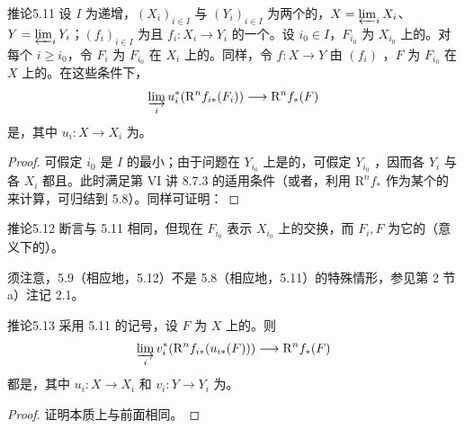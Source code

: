 \begin{SGAresult}{推论}{5.11}
设 $I$ 为递增，$(X_i)_{i\in I}$ 与 $(Y_i)_{i\in I}$ 为两个的，$X=\varprojlim_iX_i$、$Y=\varprojlim_iY_i$；$(f_i)_{i\in I}$ 为且 $f_i:X_i\to Y_i$ 的一个。设 $i_0\in I$，$F_{i_0}$ 为 $X_{i_0}$ 上的。对每个 $i\geq i_0$，令 $F_i$ 为 $F_{i_0}$ 在 $X_i$ 上的。同样，令 $f:X\to Y$ 由 $(f_i)$ ，$F$ 为 $F_{i_0}$ 在 $X$ 上的。在这些条件下，
\[
 \varinjlim_i u_i^*(\mathrm R^nf_{i*}(F_i))\longrightarrow\mathrm R^nf_*(F)
\]
是，其中 $u_i:X\to X_i$ 为。
\end{SGAresult}
\begin{proof}
可假定 $i_0$ 是 $I$ 的最小；由于问题在 $Y_{i_0}$ 上是的，可假定 $Y_{i_0}$ ，因而各 $Y_i$ 与各 $X_i$ 都且。此时满足第 VI 讲 8.7.3 的适用条件（或者，利用 $\mathrm R^nf_*$ 作为某个的来计算，可归结到 5.8）。同样可证明：
\end{proof}

\begin{SGAresult}{推论}{5.12}
断言与 5.11 相同，但现在 $F_{i_0}$ 表示 $X_{i_0}$ 上的交换，而 $F_i,F$ 为它的（意义下的）。
\end{SGAresult}
须注意，5.9（相应地，5.12）不是 5.8（相应地，5.11）的特殊情形，参见第 2 节 a）注记 2.1。

\begin{SGAresult}{推论}{5.13}
采用 5.11 的记号，设 $F$ 为 $X$ 上的。则
\[
 \varinjlim_i v_i^*(\mathrm R^nf_{i*}(u_{i*}(F)))\longrightarrow\mathrm R^nf_*(F)
\]
都是，其中 $u_i:X\to X_i$ 和 $v_i:Y\to Y_i$ 为。
\end{SGAresult}
\begin{proof}
证明本质上与前面相同。
\end{proof}


